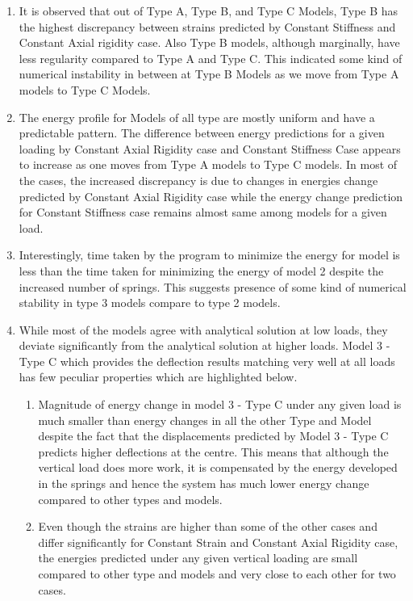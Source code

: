 \begin{enumerate}
    \item It is observed that out of Type A, Type B, and Type C Models, Type B has the highest discrepancy between strains predicted by Constant Stiffness and Constant Axial rigidity case. Also Type B models, although marginally, have less regularity compared to Type A and Type C. This indicated some kind of numerical instability in between at Type B Models as we move from Type A models to Type C Models.
    \item The energy profile for Models of all type are mostly uniform and have a predictable pattern. The difference between energy predictions for a given loading by Constant Axial Rigidity case and Constant Stiffness Case appears to increase as one moves from Type A models to Type C models. In most of the cases, the increased discrepancy is due to changes in energies change predicted by Constant Axial Rigidity case while the energy change prediction for Constant Stiffness case remains almost same among models for a given load.
    \item Interestingly, time taken by the program to minimize the energy for model is less than the time taken for minimizing the energy of model 2 despite the increased number of springs. This suggests presence of some kind of numerical stability in type 3 models compare to type 2 models.
    \item While most of the models agree with analytical solution at low loads, they deviate significantly from the analytical solution at higher loads. Model 3 - Type C which provides the deflection results matching very well at all loads has few peculiar properties which are highlighted below.
    \begin{enumerate}
        \item Magnitude of energy change in model 3 - Type C under any given load is much smaller than energy changes in all the other Type and Model despite the fact that the displacements predicted by Model 3 - Type C predicts higher deflections at the centre. This means that although the vertical load does more work, it is compensated by the energy developed in the springs and hence the system has much lower energy change compared to other types and models.
        \item Even though the strains are higher than some of the other cases and differ significantly for Constant Strain and Constant Axial Rigidity case, the energies predicted under any given vertical loading are small compared to other type and models and very close to each other for two cases.
    \end{enumerate}
\end{enumerate}

